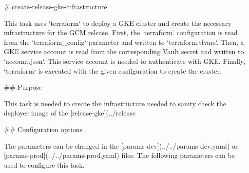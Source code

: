 # create-release-gke-infrastructure

This task uses `terraform` to deploy a GKE cluster and create the necessary infrastructure for the GCM release.
First, the `terraform` configuration is read from the `{terraform_config}` parameter and written to `terraform.tfvars`.
Then, a GKE service account is read from the corresponding Vault secret and written to `account.json`.
This service account is needed to authenticate with GKE.
Finally, `terraform` is executed with the given configuration to create the cluster.

## Purpose

This task is needed to create the infrastructure needed to sanity check the deployer image of the [release-gke](../release%

## Configuration options

The parameters can be changed in the [params-dev](../../params-dev.yaml) or [params-prod](../../params-prod.yaml) files.
The following parameters can be used to configure this task.

